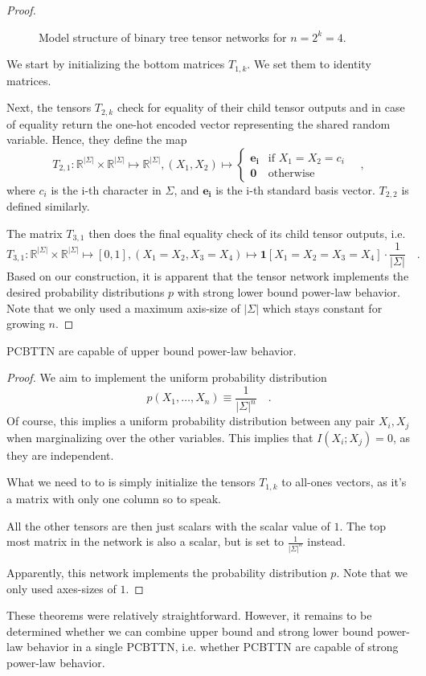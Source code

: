 \documentclass[../../main.tex]{subfiles}
\begin{document}
\begin{proof}
\begin{figure}[h]
\begin{tikzpicture}
            \end{tikzpicture}
            \caption{Model structure of binary tree tensor networks for $n = 2^k = 4$.}
            \label{fig:binary_tree_tensor_network_n_equals_four_2}
        \end{figure}
        
        We start by initializing the bottom matrices $T_{1,k}$. We set them to identity matrices.

        Next, the tensors $T_{2,k}$ check for equality of their child tensor outputs and in case of equality return the one-hot encoded vector representing the shared random variable. Hence, they define the map
        \[
            T_{2,1}: \mathbb{R}^{|\Sigma|} \times \mathbb{R}^{|\Sigma|} \mapsto \mathbb{R}^{|\Sigma|}, (X_1, X_2) \mapsto
            \begin{cases}
                \bm{e_i} & \text{if } X_1 = X_2 = c_i \\
                \bm{0} & \text{otherwise}
            \end{cases}
            \quad ,
        \]
        where $c_i$ is the i-th character in $\Sigma$, and $\bm{e_i}$ is the i-th standard basis vector. $T_{2,2}$ is defined similarly.

        The matrix $T_{3,1}$ then does the final equality check of its child tensor outputs, i.e.
        \[
            T_{3,1}: \mathbb{R}^{|\Sigma|} \times \mathbb{R}^{|\Sigma|} \mapsto [0, 1], (X_1 = X_2, X_3 = X_4) \mapsto \bm{1}[X_1 = X_2 = X_3 = X_4] \cdot \frac{1}{|\Sigma|} \quad .
        \]
        Based on our construction, it is apparent that the tensor network implements the desired probability distributions $p$ with strong lower bound power-law behavior. Note that we only used a maximum axis-size of $|\Sigma|$ which stays constant for growing $n$.
    \end{proof}

    \begin{theorem}
        PCBTTN are capable of upper bound power-law behavior.
    \end{theorem}
    \begin{proof}
        We aim to implement the uniform probability distribution
        \[
            p(X_1, \dots, X_n) \equiv \frac{1}{|\Sigma|^n} \quad .
        \]
        Of course, this implies a uniform probability distribution between any pair $X_i, X_j$ when marginalizing over the other variables. This implies that $I(X_i;X_j) = 0$, as they are independent.

        What we need to to is simply initialize the tensors $T_{1,k}$ to all-ones vectors, as it's a matrix with only one column so to speak.

        All the other tensors are then just scalars with the scalar value of $1$. The top most matrix in the network is also a scalar, but is set to $\frac{1}{|\Sigma|^n}$ instead.

        Apparently, this network implements the probability distribution $p$. Note that we only used axes-sizes of $1$.
    \end{proof}

    These theorems were relatively straightforward. However, it remains to be determined whether we can combine upper bound and strong lower bound power-law behavior in a single PCBTTN, i.e. whether PCBTTN are capable of strong power-law behavior.
\end{document}
